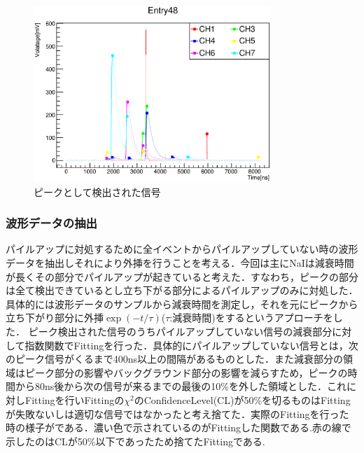\begin{figure}[bht]
  \centering
  \includegraphics[width=0.8\textwidth]{figure/hatano/peakdata.eps}
  \caption{ピークとして検出された信号}
  \label{hatano_fig:peakdata}
\end{figure}

\subsubsection{波形データの抽出}
パイルアップに対処するために全イベントからパイルアップしていない時の波形データを抽出しそれにより外挿を行うことを考える．今回は主にNaIは減衰時間が長くその部分でパイルアップが起きていると考えた．すなわち，ピークの部分は全て検出できているとし立ち下がる部分によるパイルアップのみに対処した．具体的には波形データのサンプルから減衰時間を測定し，それを元にピークから立ち下がり部分に外挿$\exp(-t/\tau)$($\tau$:減衰時間)をするというアプローチをした．
ピーク検出された信号のうちパイルアップしていない信号の減衰部分に対して指数関数でFittingを行った．具体的にパイルアップしていない信号とは，次のピーク信号がくるまで400ns以上の間隔があるものとした．また減衰部分の領域はピーク部分の影響やバックグラウンド部分の影響を減らすため，ピークの時間から80ns後から次の信号が来るまでの最後の10\%を外した領域とした．これに対しFittingを行いFittingの$\chi^2$のConfidenceLevel(CL)が50\%を切るものはFittingが失敗ないしは適切な信号ではなかったと考え捨てた．実際のFittingを行った時の様子がである．濃い色で示されているのがFittingした関数である.赤の線で示したのはCLが50\%以下であったため捨てたFittingである.

